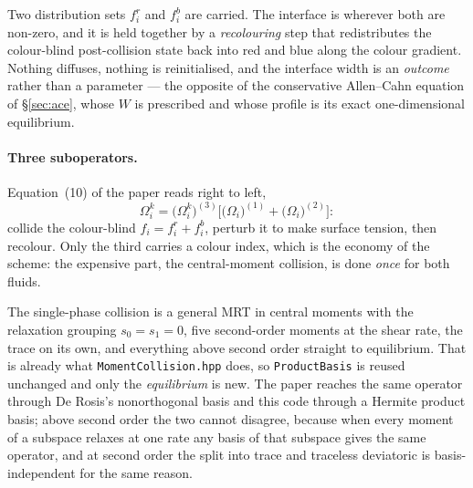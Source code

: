 \documentclass[11pt,a4paper]{article}
\newcommand{\code}[1]{\texttt{\small #1}}
\begin{document}
Two distribution sets $f_i^r$ and $f_i^b$ are carried. The interface is wherever
both are non-zero, and it is held together by a \emph{recolouring} step that
redistributes the colour-blind post-collision state back into red and blue along
the colour gradient. Nothing diffuses, nothing is reinitialised, and the
interface width is an \emph{outcome} rather than a parameter --- the opposite of
the conservative Allen--Cahn equation of \S\ref{sec:ace}, whose $W$ is
prescribed and whose profile is its exact one-dimensional equilibrium.

\paragraph{Three suboperators.} Equation~(10) of the paper reads right to left,
\begin{equation}
  \Omega_i^k = \big(\Omega_i^k\big)^{(3)}
               \Big[\big(\Omega_i\big)^{(1)} + \big(\Omega_i\big)^{(2)}\Big] :
\end{equation}
collide the colour-blind $f_i = f_i^r + f_i^b$, perturb it to make surface
tension, then recolour. Only the third carries a colour index, which is the
economy of the scheme: the expensive part, the central-moment collision, is done
\emph{once} for both fluids.

The single-phase collision is a general MRT in central moments with the
relaxation grouping $s_0 = s_1 = 0$, five second-order moments at the shear
rate, the trace on its own, and everything above second order straight to
equilibrium. That is already what \code{MomentCollision.hpp} does, so
\code{ProductBasis} is reused unchanged and only the \emph{equilibrium} is new.
The paper reaches the same operator through De Rosis's nonorthogonal basis and
this code through a Hermite product basis; above second order the two cannot
disagree, because when every moment of a subspace relaxes at one rate any basis
of that subspace gives the same operator, and at second order the split into
trace and traceless deviatoric is basis-independent for the same reason.
\end{document}
